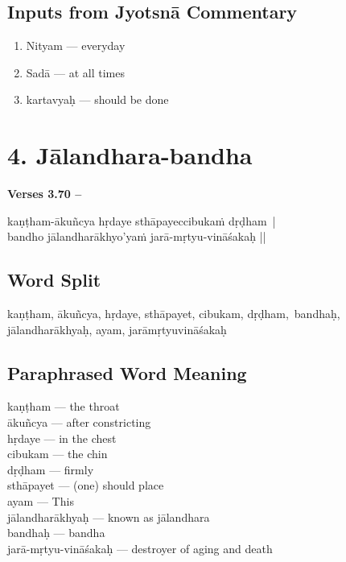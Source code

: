 \subsection*{Inputs from Jyotsnā Commentary}

\begin{enumerate}
\item Nityam --- everyday 
\item Sadā --- at all times 
\item kartavyaḥ --- should be done 
\end{enumerate}

\section*{4. Jālandhara-bandha}

\noindent \textbf{Verses 3.70 –}

\begin{shloka}
kaṇṭham-ākuñcya hṛdaye sthāpayeccibukaṁ dṛḍham |\\
bandho jālandharākhyo'yaṁ jarā-mṛtyu-vināśakaḥ ||
\end{shloka}

\subsection*{Word Split}

kaṇṭham, ākuñcya, hṛdaye, sthāpayet, cibukam, dṛḍham, bandhaḥ, jālandharākhyaḥ, ayam,  jarāmṛtyuvināśakaḥ 

\subsection*{Paraphrased Word Meaning}

\begin{multicols}{2}
kaṇṭham --- the throat\\
ākuñcya --- after constricting \\
hṛdaye --- in the chest \\
cibukam --- the chin \\
dṛḍham --- firmly \\
sthāpayet --- (one) should place \\
ayam --- This \\
jālandharākhyaḥ --- known as jālandhara\\
bandhaḥ --- bandha \\
jarā-mṛtyu-vināśakaḥ ---  destroyer of aging and death 
\end{multicols}

